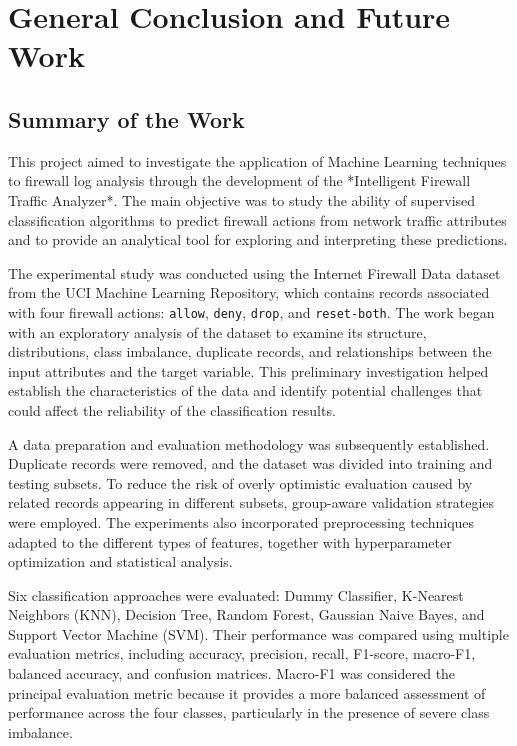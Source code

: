 \chapter*{General Conclusion and Future Work}

\section*{Summary of the Work}
This project aimed to investigate the application of Machine Learning techniques to firewall log analysis through the development of the *Intelligent Firewall Traffic Analyzer*. The main objective was to study the ability of supervised classification algorithms to predict firewall actions from network traffic attributes and to provide an analytical tool for exploring and interpreting these predictions.

The experimental study was conducted using the Internet Firewall Data dataset from the UCI Machine Learning Repository, which contains records associated with four firewall actions: \texttt{allow}, \texttt{deny}, \texttt{drop}, and \texttt{reset-both}. The work began with an exploratory analysis of the dataset to examine its structure, distributions, class imbalance, duplicate records, and relationships between the input attributes and the target variable. This preliminary investigation helped establish the characteristics of the data and identify potential challenges that could affect the reliability of the classification results.

A data preparation and evaluation methodology was subsequently established. Duplicate records were removed, and the dataset was divided into training and testing subsets. To reduce the risk of overly optimistic evaluation caused by related records appearing in different subsets, group-aware validation strategies were employed. The experiments also incorporated preprocessing techniques adapted to the different types of features, together with hyperparameter optimization and statistical analysis.

Six classification approaches were evaluated: Dummy Classifier, K-Nearest Neighbors (KNN), Decision Tree, Random Forest, Gaussian Naive Bayes, and Support Vector Machine (SVM). Their performance was compared using multiple evaluation metrics, including accuracy, precision, recall, F1-score, macro-F1, balanced accuracy, and confusion matrices. Macro-F1 was considered the principal evaluation metric because it provides a more balanced assessment of performance across the four classes, particularly in the presence of severe class imbalance.

